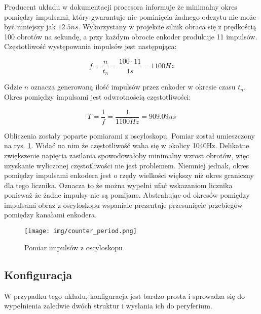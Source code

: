             Producent układu w dokumentacji procesora informuje że minimalny okres pomiędzy impulsami, który gwarantuje nie pominięcia żadnego odczytu nie może być mniejszy jak $12.5ns$. Wykorzystany w projekcie silnik obraca się z prędkością 100 obrotów na sekundę, a przy każdym obrocie enkoder produkuje 11 impulsów. Częstotliwość występowania impulsów jest następująca:
            
            \begin{displaymath}
              f = \frac{ n }{t_{n}} = \frac{ 100 \cdot 11 }{1s} = 1100Hz
            \end{displaymath}
            
            Gdzie $n$ oznacza generowaną ilość impulsów przez enkoder w okresie czasu $t_{n}$. Okres pomiędzy impulsami jest odwrotnością częstotliwości:
            
            \begin{displaymath}
              T = \frac{1}{ f } = \frac{1}{ 1100Hz } = 909.09 us
            \end{displaymath}
            
            Obliczenia zostały poparte pomiarami z oscyloskopu. Pomiar został umieszczony na rys. \ref{fig:pcnt_osc}. Widać na nim że częstotliwość waha się w okolicy 1040Hz. Delikatne zwiększenie napięcia zasilania spowodowałoby minimalny wzrost obrotów, więc uzyskanie wyliczonej częstotliwości nie jest problemem. Niemniej jednak, okres pomiędzy impulsami enkodera jest o rzędy wielkości większy niż okres graniczny dla tego licznika. Oznacza to że można wypełni ufać wskazaniom licznika ponieważ że żadne impulsy nie są pomijane.
            Abstrahując od okresów pomiędzy impulsami obraz z oscyloskopu wspaniale prezentuje przesunięcie przebiegów pomiędzy kanałami enkodera. 
            
            
            \begin{figure}[ht]
                \centering
                \texttt{[image: img/counter\_period.png]}
                \caption{Pomiar impulsów z oscyloskopu}
                \label{fig:pcnt_osc}
            \end{figure}
            
            
            
            
        \subsection{Konfiguracja}
            W przypadku tego układu, konfiguracja jest bardzo prosta i sprowadza się do wypełnienia zaledwie dwóch struktur i wysłania ich do peryferium.
            
